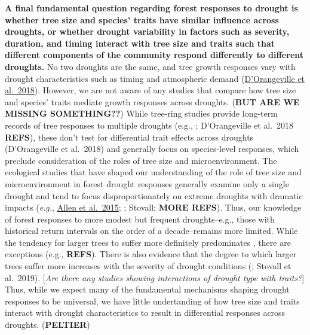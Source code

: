 \documentclass[]{article}
\begin{document}
\textbf{A final fundamental question regarding forest responses to
drought is whether tree size and species' traits have similar influence
across droughts, or whether drought variability in factors such as
severity, duration, and timing interact with tree size and traits such
that different components of the community respond differently to
different droughts.} No two droughts are the same, and tree growth
responses vary with drought characteristics such as timing and
atmospheric demand
(\href{https://onlinelibrary-wiley-com.smithsonian.idm.oclc.org/doi/full/10.1111/gcb.14096}{D'Orangeville
et al.~2018}). However, we are not aware of any studies that compare how
tree size and species' traits mediate growth responses across droughts.
(\textbf{BUT ARE WE MISSING SOMETHING??}) While tree-ring studies
provide long-term records of tree responses to multiple droughts (e.g.,
\citep{lloret_components_2011}; D'Orangeville et al.~2018
\textbf{REFS}), these don't test for differential trait effects across
droughts (D'Orangeville et al.~2018) and generally focus on
species-level responses, which preclude consideration of the roles of
tree size and microenvironment. The ecological studies that have shaped
our understanding of the role of tree size and microenvironment in
forest drought responses generally examine only a single drought and
tend to focus disproportionately on extreme droughts with dramatic
impacts (\emph{e.g.},
\href{https://doi.org/10.1016/j.foreco.2009.09.001}{Allen et al.~2015};
\citep{bennett_larger_2015}; Stovall; \textbf{MORE REFS}). Thus, our
knowledge of forest responses to more modest but frequent
droughts--e.g., those with historical return intervals on the order of a
decade--remains more limited. While the tendency for larger trees to
suffer more definitely predominates \citep{bennett_larger_2015}, there
are exceptions (e.g., \textbf{REFS}). There is also evidence that the
degree to which larger trees suffer more increases with the severity of
drought conditions (\citep{bennett_larger_2015}; Stovall et al.~2019).
{[}\emph{Are there any studies showing interactions of drought type with
traits?}{]} Thus, while we expect many of the fundamental mechanisms
shaping drought responses to be universal, we have little undertanding
of how tree size and traits interact with drought characteristics to
result in differential responses across droughts. (\textbf{PELTIER})
\end{document}
